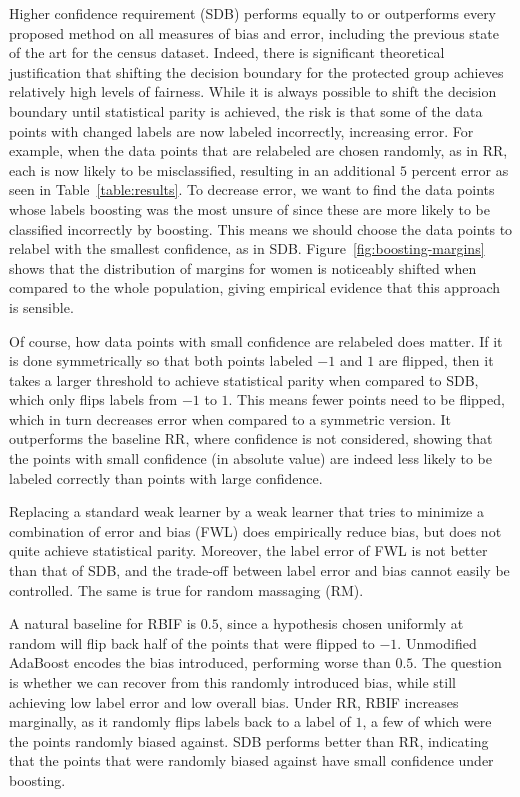 \documentclass{article}
\begin{document}
Higher confidence requirement (SDB) performs equally to or outperforms every proposed
method on all measures of bias and error, including the previous state of the
art for the census dataset. Indeed, there is significant theoretical
justification that shifting the decision boundary for the protected group
achieves relatively high levels of fairness.  While it is always possible to
shift the decision boundary until statistical parity is achieved, the risk is
that some of the data points with changed labels are now labeled incorrectly,
increasing error.  For example, when the data points that are relabeled are
chosen randomly, as in RR, each is now likely to be misclassified, resulting in
an additional $5$ percent error as seen in Table~\ref{table:results}.  To
decrease error, we want to find the data points whose labels boosting was the
most unsure of since these are more likely to be classified incorrectly by
boosting.  This means we should choose the data points to relabel with the
smallest confidence, as in SDB.  Figure~\ref{fig:boosting-margins} shows that the
distribution of margins for women is noticeably shifted when compared to the
whole population, giving empirical evidence that this approach is sensible.

Of course, how data points with small confidence are relabeled does matter.  If it
is done symmetrically so that both points labeled $-1$ and $1$ are flipped,
then it takes a larger threshold to achieve statistical parity when compared to
SDB, which only flips labels from $-1$ to $1$.  This means fewer points need to
be flipped, which in turn decreases error when compared to a symmetric version.
It outperforms the baseline RR, where confidence is not considered, showing that
the points with small confidence (in absolute value) are indeed less likely to be
labeled correctly than points with large confidence.

Replacing a standard weak learner by a weak learner that tries to minimize a
combination of error and bias (FWL) does empirically reduce bias, but does not
quite achieve statistical parity. Moreover, the label error of FWL is not
better than that of SDB, and the trade-off between label error and bias cannot
easily be controlled. The same is true for random massaging (RM).

A natural baseline for RBIF is $0.5$, since a hypothesis chosen uniformly at
random will flip back half of the points that were flipped to $-1$.  Unmodified
AdaBoost encodes the bias introduced, performing worse than $0.5$.  The
question is whether we can recover from this randomly introduced bias, while
still achieving low label error and low overall bias.  Under RR, RBIF increases
marginally, as it randomly flips labels back to a label of $1$, a few of which
were the points randomly biased against.  SDB performs better than RR,
indicating that the points that were randomly biased against have small confidence
under boosting.
\end{document}
